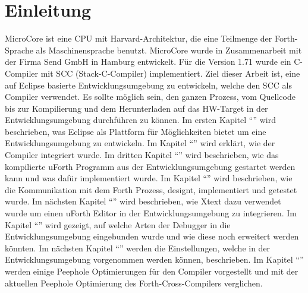 \chapter{Einleitung}

MicroCore ist eine CPU mit Harvard-Architektur, die eine Teilmenge der Forth-Sprache als Maschinensprache benutzt. MicroCore wurde in Zusammenarbeit mit der Firma Send GmbH in Hamburg entwickelt. Für die Version 1.71 wurde ein C-Compiler mit SCC (Stack-C-Compiler) implementiert. Ziel dieser Arbeit ist, eine auf Eclipse basierte Entwicklungsumgebung zu entwickeln, welche den SCC als Compiler verwendet. Es sollte möglich sein, den ganzen Prozess, vom Quellcode bis zur Kompilierung und dem Herunterladen auf das HW-Target in der Entwicklungsumgebung durchführen zu können. Im ersten Kapitel "`"' wird beschrieben, was Eclipse als Plattform für Möglichkeiten bietet um eine Entwicklungsumgebung zu entwickeln. Im Kapitel "`"' wird erklärt, wie der Compiler integriert wurde. Im dritten Kapitel "`"' wird beschrieben, wie das kompilierte uForth Programm aus der Entwicklungsumgebung gestartet werden kann und was dafür implementiert wurde. Im Kapitel "`"' wird beschrieben, wie die Kommunikation mit dem Forth Prozess, designt, implementiert und getestet wurde. Im nächsten Kapitel "`"' wird beschrieben, wie Xtext dazu verwendet wurde um einen uForth Editor in der Entwicklungsumgebung zu integrieren. Im Kapitel "`"' wird gezeigt, auf welche Arten der Debugger in die Entwicklungsumgebung eingebunden wurde und wie diese noch erweitert werden könnten. Im nächsten Kapitel "`"' werden die Einstellungen, welche in der Entwicklungsumgebung vorgenommen werden können, beschrieben. Im Kapitel "`"' werden einige Peephole Optimierungen für den Compiler vorgestellt und mit der aktuellen Peephole Optimierung des Forth-Cross-Compilers verglichen.

